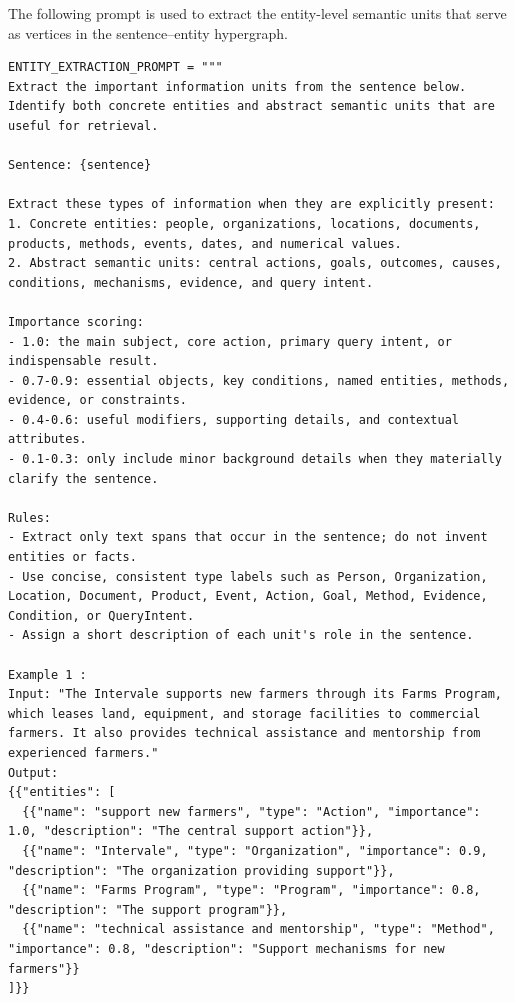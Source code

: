 \documentclass{article} %
\begin{document}
The following prompt is used to extract the entity-level semantic units that serve as vertices in the sentence--entity hypergraph.
\begin{lstlisting}
ENTITY_EXTRACTION_PROMPT = """
Extract the important information units from the sentence below. Identify both concrete entities and abstract semantic units that are useful for retrieval.

Sentence: {sentence}

Extract these types of information when they are explicitly present:
1. Concrete entities: people, organizations, locations, documents, products, methods, events, dates, and numerical values.
2. Abstract semantic units: central actions, goals, outcomes, causes, conditions, mechanisms, evidence, and query intent.

Importance scoring:
- 1.0: the main subject, core action, primary query intent, or indispensable result.
- 0.7-0.9: essential objects, key conditions, named entities, methods, evidence, or constraints.
- 0.4-0.6: useful modifiers, supporting details, and contextual attributes.
- 0.1-0.3: only include minor background details when they materially clarify the sentence.

Rules:
- Extract only text spans that occur in the sentence; do not invent entities or facts.
- Use concise, consistent type labels such as Person, Organization, Location, Document, Product, Event, Action, Goal, Method, Evidence, Condition, or QueryIntent.
- Assign a short description of each unit's role in the sentence.

Example 1 :
Input: "The Intervale supports new farmers through its Farms Program, which leases land, equipment, and storage facilities to commercial farmers. It also provides technical assistance and mentorship from experienced farmers."
Output:
{{"entities": [
  {{"name": "support new farmers", "type": "Action", "importance": 1.0, "description": "The central support action"}},
  {{"name": "Intervale", "type": "Organization", "importance": 0.9, "description": "The organization providing support"}},
  {{"name": "Farms Program", "type": "Program", "importance": 0.8, "description": "The support program"}},
  {{"name": "technical assistance and mentorship", "type": "Method", "importance": 0.8, "description": "Support mechanisms for new farmers"}}
]}}


\end{lstlisting}
\end{document}
